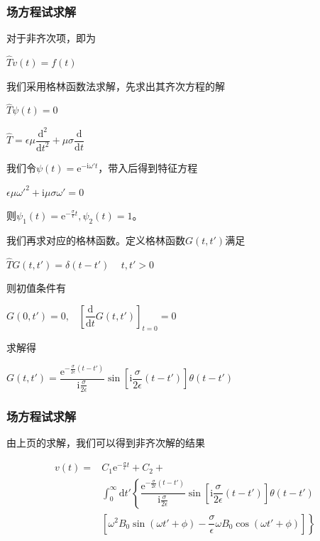 \documentclass[11pt]{beamer}                                                                                               \usetheme{Boadilla}
\begin{document}
	\begin{frame}[fragile]
		\frametitle{场方程试求解}
	
		对于非齐次项，即为
	
		\centerline{$\hat{T}v(t)=f(t)$}
		
		我们采用格林函数法求解，先求出其齐次方程的解
		
		\centerline{$\hat{T}\psi(t)=0$}
		\centerline{$\hat{T}=\epsilon\mu\dfrac{\mathrm{d}^2}{\mathrm{d} t^2}+\mu \sigma \dfrac{\mathrm{d}}{\mathrm{d} t}$}
		
		我们令$\psi(t)=\mathrm{e}^{-\mathrm{i}\omega' t}$，带入后得到特征方程
		
		\centerline{$\epsilon \mu \omega'^2+\mathrm{i}\mu \sigma \omega'=0$}
		
		则$\psi_1(t)=\mathrm{e}^{-\frac{\sigma}{\epsilon}t},\psi_2(t)=1$。
		
		我们再求对应的格林函数。定义格林函数$G(t,t')$满足
		
		\centerline{$\hat{T}G(t,t')=\delta(t-t')\,\,\,\,\,\,\,t,t'>0$}
		
		则初值条件有
		
		\centerline{$G(0,t')=0,\,\,\,\,\,\left[\dfrac{\mathrm{d}}{\mathrm{d}t}G(t,t')\right]_{t=0}=0$}
		
		求解得
		
		\centerline{$G(t,t')=\dfrac{\mathrm{e}^{-\frac{\sigma}{2 \epsilon}(t-t')}}{\mathrm{i}\frac{\sigma}{2 \epsilon}} \sin\left[\mathrm{i}\dfrac{\sigma}{2 \epsilon}(t-t')\right] \theta(t-t')$}
			
	\end{frame}
	
	\begin{frame}[fragile]
		\frametitle{场方程试求解}
		由上页的求解，我们可以得到非齐次解的结果
		
		\begin{equation*}
		\begin{split}
			v(t)=&C_1\mathrm{e}^{-\frac{\sigma}{\epsilon}t}+C_2+\\
			&\displaystyle\int_0^{\infty} \mathrm{d}t' \left\{\dfrac{\mathrm{e}^{-\frac{\sigma}{2 \epsilon}(t-t')}}{\mathrm{i}\frac{\sigma}{2 \epsilon}} \sin\left[\mathrm{i}\dfrac{\sigma}{2 \epsilon}(t-t')\right] \theta(t-t')\right.\\
			&\left.\left[\omega^2 B_0 \sin(\omega t'+\phi)-\dfrac{ \sigma}{\epsilon} \omega B_0 \cos(\omega t'+\phi)\right]\right\}
		\end{split}
	    \end{equation*}
	\end{frame}
	
\end{document}
